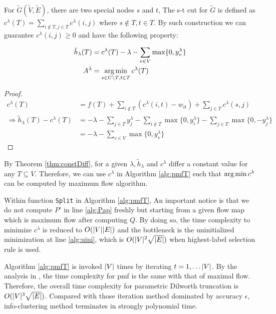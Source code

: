 \documentclass{article}
\begin{document}
For $\widetilde{G}(\widetilde{V}, \widetilde{E})$, there are two special nodes $s$ and $t$, The s-t cut for $\widetilde{G}$
is defined as $c^{\lambda}(T) = \sum_{i \not\in T, j \in T} c^{\lambda}(i,j)$ where $s \not\in T, t \in T$. By such construction we can guarantee $c^{\lambda}(i,j)\geq 0$ and have the following property:
\begin{theorem}\label{thm:constDiff}
	\begin{align}
		\tilde{h}_{\lambda}(T) &= c^{\lambda}(T) - \lambda - \sum_{v \in V} \max\{0, y^{\lambda}_v\}\\
	A^{\lambda}	&= \operatorname*{arg\,min}_{s\in U\backslash T, t\in T}c^{\lambda}(T) \label{eq:pmqe}
	\end{align}
\end{theorem}
\begin{proof}
	
	\begin{align*}
	c^{\lambda}(T) &= f(T) + \sum_{i \not\in T} (c^{\lambda}(i, t) - w_{it})+ \sum_{j \in T} c^{\lambda}(s,j) \\
	\Rightarrow \tilde{h}_{\lambda}(T) - c^{\lambda}(T) &= -\lambda - \sum_{j \in T} y^{\lambda}_j - \sum_{i \not\in T} \max\{0, y^{\lambda}_i\} - \sum_{j \in T} \max\{0,-y^{\lambda}_j\}\\
	&= -\lambda - \sum_{v \in V} \max\{0, y^{\lambda}_v\}
	\end{align*}
\end{proof}

By Theorem \ref{thm:constDiff}, for a given $\lambda, \tilde{h}_{\lambda}$ and $c^{\lambda}$ differ a constant value for any $T\subseteq V$. Therefore, we can use $c^{\lambda}$ in Algorithm \ref{alg:pmfT} such that $\operatorname*{arg\,min} c^{\lambda}$ can be computed by maximum flow algorithm. 

Within function \texttt{Split} in Algorithm \ref{alg:pmfT}, An important notice is that we do not compute $P'$ in line \ref{alg:Pap} freshly but starting from a given flow map which is maximum flow after computing $Q$. By doing so, the time complexity to minimize $c^{\lambda}$ is reduced to $O(\lvert V\rvert\lvert E\rvert)$ and the bottleneck is the uninitialized minimization at line \ref{alg:uini}, which is $O(\lvert V\rvert^2\sqrt{\lvert E\rvert})$ when highest-label selection rule is used.

Algorithm \ref{alg:pmfT} is invoked $\lvert V\rvert$ times by iterating $t=1,\dots \lvert V\rvert$. By the analysis in \cite{RN17}, the time complexity for pmf is the same with that of maximal flow.
Therefore, the overall time complexity for parametric Dilworth truncation is $O(\lvert V\rvert^3\sqrt{\lvert E\rvert})$. Compared with those iteration method dominated by accuracy $\epsilon$, info-clustering method terminates in strongly polynomial time.
\end{document}
